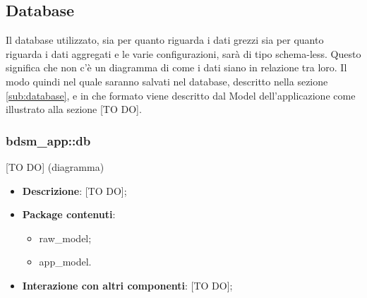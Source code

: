 %


\subsection{Database} %
\label{sec:database}
Il database utilizzato, sia per quanto riguarda i dati grezzi sia per quanto riguarda i dati aggregati e le varie configurazioni, sarà di tipo schema-less. Questo significa che non c'è un diagramma di come i dati siano in relazione tra loro. \newline
Il modo quindi nel quale saranno salvati nel database, descritto nella sezione \ref{sub:database}, e in che formato viene descritto dal Model dell'applicazione come illustrato alla sezione [TO DO]. \newline


  \subsubsection{bdsm\_app::db} %
  \label{ssub:bdsm_app_db}
  [TO DO] (diagramma) \newline \newline

  \begin{itemize}
    \item \textbf{Descrizione}: [TO DO];
    \item \textbf{Package contenuti}:
      \begin{itemize}
        \item raw_model;
        \item app_model.
      \end{itemize}
    \item \textbf{Interazione con altri componenti}: [TO DO];
  \end{itemize}


